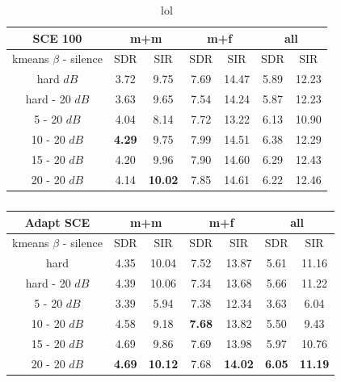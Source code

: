 \documentclass[master, tikz, final,11pt, dvipdfmx]{iscs-thesis}
\begin{document}
\begin{table}[h]
\centering
\begin{tabular}{c|c|c|c|c|c|c}
SCE 100 & \multicolumn{2}{c|}{m+m} & \multicolumn{2}{c|}{m+f} & \multicolumn{2}{c}{all} \\ 
\hline 
kmeans $\beta$ - silence & SDR & SIR & SDR & SIR & SDR & SIR \\ 
\hline 
hard $dB$ & 3.72 & 9.75 & 7.69 & 14.47 & 5.89 & 12.23 \\ 
hard - 20 $dB$ & 3.63 & 9.65 & 7.54 & 14.24 & 5.87 & 12.23 \\ 
\hline 
\hline 
5 - 20 $dB$ & 4.04 & 8.14 & 7.72 & 13.22 & 6.13 & 10.90 \\ 
10 - 20 $dB$ & \cellcolor{green}\textbf{4.29} & \cellcolor{green}9.75 & \cellcolor{green}7.99 & \cellcolor{green}14.51 & 6.38 & 12.29 \\ 
15 - 20 $dB$ & 4.20 & 9.96 & 7.90 & 14.60 & 6.29 & 12.43 \\ 
20 - 20 $dB$ & 4.14 & \textbf{10.02} & 7.85 & 14.61 & 6.22 & 12.46 \\ 
\end{tabular}
\captionsetup{justification=centering}
\caption{lol}
\label{table:SCE100softkmeans}
\end{table}


\begin{table}[h]
\centering
\begin{tabular}{c|c|c|c|c|c|c}
Adapt SCE & \multicolumn{2}{c|}{m+m} & \multicolumn{2}{c|}{m+f} & \multicolumn{2}{c}{all} \\ 
\hline 
kmeans $\beta$ - silence & SDR & SIR & SDR & SIR & SDR & SIR \\ 
\hline
hard   & 4.35 & 10.04 & 7.52 & 13.87 & 5.61 & 11.16 \\ 
hard - 20 $dB$  & 4.39 & 10.06 & 7.34 & 13.68 & 5.66 & 11.22 \\
\hline
\hline
5 - 20 $dB$  & 3.39 & 5.94 & 7.38 & 12.34 & 3.63 & 6.04 \\ 
10 - 20 $dB$  & 4.58 & 9.18 & \cellcolor{green}\textbf{7.68} & \cellcolor{green}13.82 & 5.50 & 9.43 \\ 
15 - 20 $dB$ & 4.69 & 9.86 & 7.69 & 13.98 & 5.97 & 10.76 \\ 
20 - 20 $dB$ & \cellcolor{green}\textbf{4.69} & \cellcolor{green}\textbf{10.12} & 7.68 & \textbf{14.02} & \cellcolor{green}\textbf{6.05} & \cellcolor{green}\textbf{11.19} \\ 
\end{tabular}
\captionsetup{justification=centering}
\caption{}
\label{table:AdaptSCE100}
\end{table}
\end{document}
